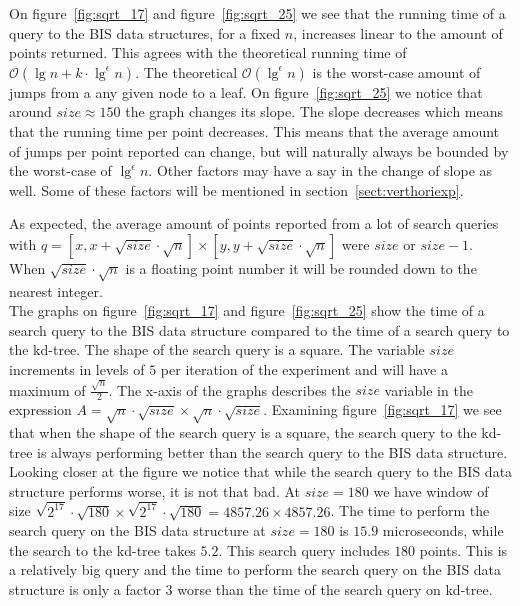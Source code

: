 On figure~\ref{fig:sqrt_17} and figure~\ref{fig:sqrt_25} we see that the running time of a query to the BIS data structures, for a fixed $n$, increases linear to the amount of points returned. This agrees with the theoretical running time of $\mathcal{O}(\lg n + k\cdot \lg^\epsilon n)$. The theoretical $\mathcal{O}(\lg^\epsilon n)$ is the worst-case amount of jumps from a any given node to a leaf. On figure~\ref{fig:sqrt_25} we notice that around $size\approx 150$ the graph changes its slope. The slope decreases which means that the running time per point decreases. This means that the average amount of jumps per point reported can change, but will naturally always be bounded by the worst-case of $\lg^\epsilon n$. Other factors may have a say in the change of slope as well. Some of these factors will be mentioned in section~\ref{sect:verthoriexp}.

\noindent As expected, the average amount of points reported from a lot of search queries with $q = [x, x + \sqrt{size}\cdot\sqrt{n}] \times [y, y + \sqrt{size}\cdot\sqrt{n}]$ were $size$ or $size-1$. When $\sqrt{size}\cdot\sqrt{n}$ is a floating point number it will be rounded down to the nearest integer. \\

The graphs on figure~\ref{fig:sqrt_17} and figure~\ref{fig:sqrt_25} show the time of a search query to the BIS data structure compared to the time of a search query to the kd-tree. The shape of the search query is a square. The variable $size$ increments in levels of $5$ per iteration of the experiment and will have a maximum of $\frac{\sqrt{n}}{2}$. The x-axis of the graphs describes the $size$ variable in the expression $A = \sqrt{n}\cdot\sqrt{size} \times \sqrt{n}\cdot\sqrt{size}$. Examining figure~\ref{fig:sqrt_17} we see that when the shape of the search query is a square, the search query to the kd-tree is always performing better than the search query to the BIS data structure. Looking closer at the figure we notice that while the search query to the BIS data structure performs worse, it is not that bad. At $size = 180$ we have window of size $\sqrt{2^{17}}\cdot\sqrt{180} \times \sqrt{2^{17}}\cdot\sqrt{180} = 4857.26 \times 4857.26$. The time to perform the search query on the BIS data structure at $size = 180$ is $15.9$ microseconds, while the search to the kd-tree takes $5.2$. This search query includes $180$ points. This is a relatively big query and the time to perform the search query on the BIS data structure is only a factor $3$ worse than the time of the search query on kd-tree.


